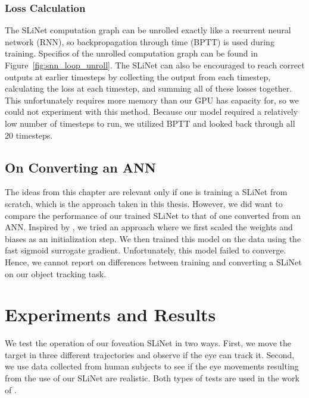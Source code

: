 \documentclass [MS] {UCLAthesis}
\begin{document}
\subsection{Loss Calculation}

The SLiNet computation graph can be unrolled exactly like a recurrent neural network (RNN), so backpropagation through time (BPTT) is used during training. Specifics of the unrolled computation graph can be found in Figure~\ref{fig:snn_loop_unroll}. The SLiNet can also be encouraged to reach correct outputs at earlier timesteps by collecting the output from each timestep, calculating the loss at each timestep, and summing all of these losses together. This unfortunately requires more memory than our GPU has capacity for, so we could not experiment with this method. Because our model required a relatively low number of timesteps to run, we utilized BPTT and looked back through all 20 timesteps.


\section{On Converting an ANN}

The ideas from this chapter are relevant only if one is training a SLiNet from scratch, which is the approach taken in this thesis. However, we did want to compare the performance of our trained SLiNet to that of one converted from an ANN. Inspired by \citet{rathi2020enabling}, we tried an approach where we first scaled the weights and biases as an initialization step. We then trained this model on the data using the fast sigmoid surrogate gradient. Unfortunately, this model failed to converge. Hence, we cannot report on differences between training and converting a SLiNet on our object tracking task.


\chapter{Experiments and Results}

We test the operation of our foveation SLiNet in two ways. First, we move the target in three different trajectories and observe if the eye can track it. Second, we use data collected from human subjects to see if the eye movements resulting from the use of our SLiNet are realistic. Both types of tests are used in the work of \citet{Masaki}. 
\end{document}

